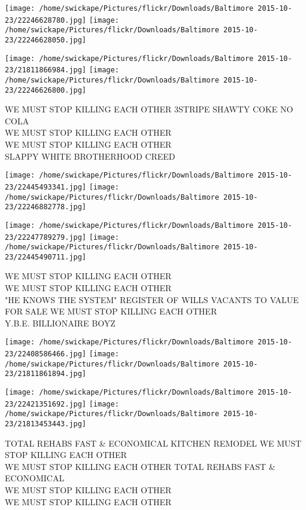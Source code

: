 \documentclass[10pt,letterpaper]{article}
\begin{document}
\texttt{[image: /home/swickape/Pictures/flickr/Downloads/Baltimore 2015-10-23/22246628780.jpg]}
\texttt{[image: /home/swickape/Pictures/flickr/Downloads/Baltimore 2015-10-23/22246628050.jpg]}

\texttt{[image: /home/swickape/Pictures/flickr/Downloads/Baltimore 2015-10-23/21811866984.jpg]}
\texttt{[image: /home/swickape/Pictures/flickr/Downloads/Baltimore 2015-10-23/22246626800.jpg]}

WE MUST STOP KILLING EACH OTHER 3STRIPE SHAWTY COKE NO COLA\\
WE MUST STOP KILLING EACH OTHER\\
WE MUST STOP KILLING EACH OTHER\\
SLAPPY WHITE BROTHERHOOD CREED\\
\pagebreak

\texttt{[image: /home/swickape/Pictures/flickr/Downloads/Baltimore 2015-10-23/22445493341.jpg]}
\texttt{[image: /home/swickape/Pictures/flickr/Downloads/Baltimore 2015-10-23/22246882778.jpg]}

\texttt{[image: /home/swickape/Pictures/flickr/Downloads/Baltimore 2015-10-23/22247789279.jpg]}
\texttt{[image: /home/swickape/Pictures/flickr/Downloads/Baltimore 2015-10-23/22445490711.jpg]}

WE MUST STOP KILLING EACH OTHER\\
WE MUST STOP KILLING EACH OTHER\\
"HE KNOWS THE SYSTEM" REGISTER OF WILLS VACANTS TO VALUE FOR SALE WE MUST STOP KILLING EACH OTHER\\
Y.B.E. BILLIONAIRE BOYZ\\
\pagebreak

\texttt{[image: /home/swickape/Pictures/flickr/Downloads/Baltimore 2015-10-23/22408586466.jpg]}
\texttt{[image: /home/swickape/Pictures/flickr/Downloads/Baltimore 2015-10-23/21811861894.jpg]}

\texttt{[image: /home/swickape/Pictures/flickr/Downloads/Baltimore 2015-10-23/22421351692.jpg]}
\texttt{[image: /home/swickape/Pictures/flickr/Downloads/Baltimore 2015-10-23/21813453443.jpg]}

TOTAL REHABS FAST \& ECONOMICAL KITCHEN REMODEL WE MUST STOP KILLING EACH OTHER\\
WE MUST STOP KILLING EACH OTHER TOTAL REHABS FAST \& ECONOMICAL\\
WE MUST STOP KILLING EACH OTHER\\
WE MUST STOP KILLING EACH OTHER\\
\pagebreak
\end{document}
